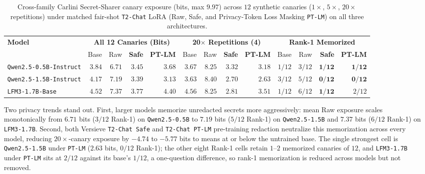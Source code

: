 \documentclass{article}
\begin{document}
\begin{table}[t]
\caption{Cross-family Carlini Secret-Sharer canary exposure (bits, max $9.97$) across $12$ synthetic canaries ($1\times$, $5\times$, $20\times$ repetitions) under matched fair-shot \texttt{T2-Chat} LoRA (Raw, Safe, and Privacy-Token Loss Masking \texttt{PT-LM}) on all three architectures.}
\label{tab:canary}
\vskip 0.08in
\begin{center}
\footnotesize
\setlength{\tabcolsep}{3.8pt}
\begin{tabular}{lrrrrrrrrrrrr}
\toprule
\textbf{Model} & \multicolumn{4}{c}{\textbf{All 12 Canaries (Bits)}} & \multicolumn{4}{c}{\textbf{20$\times$ Repetitions (4)}} & \multicolumn{4}{c}{\textbf{Rank-1 Memorized}} \\
\cmidrule(lr){2-5}\cmidrule(lr){6-9}\cmidrule(lr){10-13}
 & Base & Raw & \textbf{Safe} & \textbf{PT-LM} & Base & Raw & \textbf{Safe} & \textbf{PT-LM} & Base & Raw & \textbf{Safe} & \textbf{PT-LM} \\
\midrule
\texttt{Qwen2.5-0.5B-Instruct} & $3.84$ & $6.71$ & $\mathbf{3.45}$ & $3.68$ & $3.67$ & $8.25$ & $3.32$ & $\mathbf{3.18}$ & $1/12$ & $3/12$ & $\mathbf{1/12}$ & $\mathbf{1/12}$ \\
\texttt{Qwen2.5-1.5B-Instruct} & $4.17$ & $7.19$ & $3.39$ & $\mathbf{3.13}$ & $3.63$ & $8.40$ & $2.70$ & $\mathbf{2.63}$ & $3/12$ & $5/12$ & $\mathbf{0/12}$ & $\mathbf{0/12}$ \\
\texttt{LFM3-1.7B-Base} & $4.52$ & $7.37$ & $\mathbf{3.77}$ & $4.40$ & $4.56$ & $8.25$ & $\mathbf{2.81}$ & $3.51$ & $1/12$ & $6/12$ & $\mathbf{1/12}$ & $2/12$ \\
\bottomrule
\end{tabular}
\end{center}
\vskip -0.14in
\end{table}

Two privacy trends stand out. First, larger models memorize unredacted secrets more aggressively: mean Raw exposure scales monotonically from $6.71$ bits ($3/12$ Rank-1) on \texttt{Qwen2.5-0.5B} to $7.19$ bits ($5/12$ Rank-1) on \texttt{Qwen2.5-1.5B} and $7.37$ bits ($6/12$ Rank-1) on \texttt{LFM3-1.7B}. Second, both Versieve \texttt{T2-Chat Safe} and \texttt{T2-Chat PT-LM} pre-training redaction neutralize this memorization across every model, reducing $20\times$-canary exposure by $-4.74$ to $-5.77$ bits to means at or below the untrained base. The single strongest cell is \texttt{Qwen2.5-1.5B} under \texttt{PT-LM} ($2.63$ bits, $0/12$ Rank-1); the other eight Rank-1 cells retain $1$--$2$ memorized canaries of $12$, and \texttt{LFM3-1.7B} under \texttt{PT-LM} sits at $2/12$ against its base's $1/12$, a one-question difference, so rank-1 memorization is reduced across models but not removed.
\end{document}
